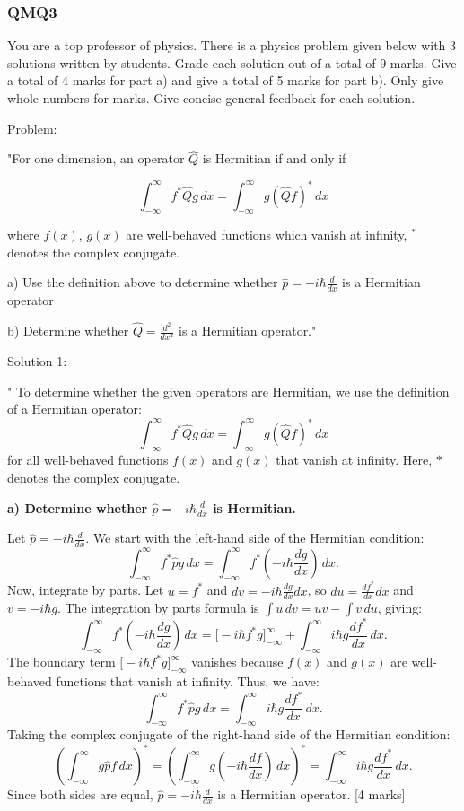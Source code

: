 \subsubsection{QMQ3}

You are a top professor of physics. There is a physics problem given below with 3 solutions written by students. Grade each solution out of a total of 9 marks. Give a total of 4 marks for part a) and give a total of 5 marks for part b). Only give whole numbers for marks. Give concise general feedback for each solution. 

Problem: 

"For one dimension, an operator \( \hat{Q} \) is Hermitian if and only if 

\[ \int_{-\infty}^{\infty} f^{*}\hat{Q}g \, dx = \int_{-\infty}^{\infty} g(\hat{Q}f)^{*} \, dx \]

where \( f(x) \), \( g(x) \) are well-behaved functions which vanish at infinity, \( ^{*} \) denotes the complex conjugate. 

a) Use the definition above to determine whether \( \hat{p} = -i\hbar\frac{d}{dx} \) is a Hermitian operator 

b) Determine whether \( \hat{Q} = \frac{d^{2}}{dx^{2}} \) is a Hermitian operator."

Solution 1: 

"
To determine whether the given operators are Hermitian, we use the definition of a Hermitian operator:
\[
\int_{-\infty}^\infty f^* \hat{Q} g \, dx = \int_{-\infty}^\infty g (\hat{Q} f)^* \, dx
\]
for all well-behaved functions $f(x)$ and $g(x)$ that vanish at infinity. Here, $*$ denotes the complex conjugate.

\textbf{a) Determine whether $\hat{p} = -i\hbar \frac{d}{dx}$ is Hermitian.}

Let $\hat{p} = -i\hbar \frac{d}{dx}$. We start with the left-hand side of the Hermitian condition:
\[
\int_{-\infty}^\infty f^* \hat{p} g \, dx = \int_{-\infty}^\infty f^* \left(-i\hbar \frac{d g}{dx}\right) \, dx.
\]
Now, integrate by parts. Let $u = f^*$ and $dv = -i\hbar \frac{d g}{dx} dx$, so $du = \frac{df^*}{dx} dx$ and $v = -i\hbar g$. The integration by parts formula is $\int u \, dv = uv - \int v \, du$, giving:
\[
\int_{-\infty}^\infty f^* \left(-i\hbar \frac{d g}{dx}\right) \, dx = \Big[ -i\hbar f^* g \Big]_{-\infty}^\infty + \int_{-\infty}^\infty i\hbar g \frac{d f^*}{dx} \, dx.
\]
The boundary term $\Big[ -i\hbar f^* g \Big]_{-\infty}^\infty$ vanishes because $f(x)$ and $g(x)$ are well-behaved functions that vanish at infinity. Thus, we have:
\[
\int_{-\infty}^\infty f^* \hat{p} g \, dx = \int_{-\infty}^\infty i\hbar g \frac{d f^*}{dx} \, dx.
\]
Taking the complex conjugate of the right-hand side of the Hermitian condition:
\[
\left(\int_{-\infty}^\infty g \hat{p} f \, dx \right)^* = \left(\int_{-\infty}^\infty g \left(-i\hbar \frac{d f}{dx}\right) \, dx \right)^* = \int_{-\infty}^\infty i\hbar g \frac{d f^*}{dx} \, dx.
\]
Since both sides are equal, $\hat{p} = -i\hbar \frac{d}{dx}$ is a Hermitian operator. \hfill [4 marks]


